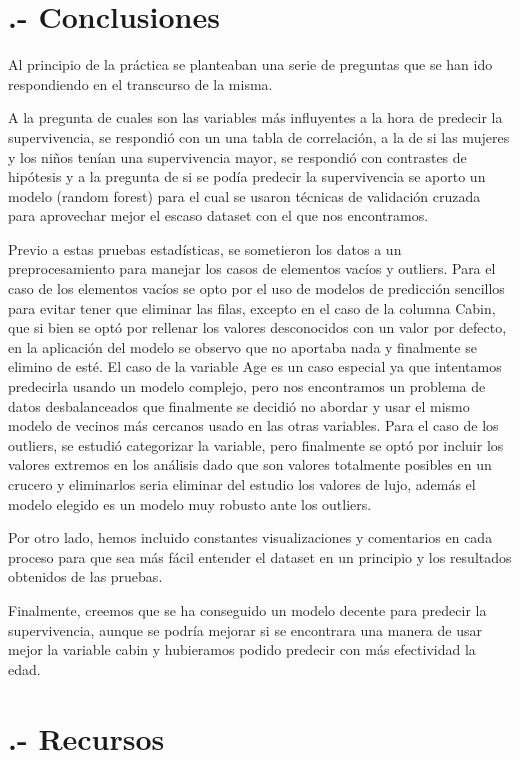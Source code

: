 \documentclass[
]{article}
\begin{document}
\hypertarget{conclusiones}{%
\section{.- Conclusiones}\label{conclusiones}}

Al principio de la práctica se planteaban una serie de preguntas que se
han ido respondiendo en el transcurso de la misma.

A la pregunta de cuales son las variables más influyentes a la hora de
predecir la supervivencia, se respondió con un una tabla de correlación,
a la de si las mujeres y los niños tenían una supervivencia mayor, se
respondió con contrastes de hipótesis y a la pregunta de si se podía
predecir la supervivencia se aporto un modelo (random forest) para el
cual se usaron técnicas de validación cruzada para aprovechar mejor el
escaso dataset con el que nos encontramos.

Previo a estas pruebas estadísticas, se sometieron los datos a un
preprocesamiento para manejar los casos de elementos vacíos y outliers.
Para el caso de los elementos vacíos se opto por el uso de modelos de
predicción sencillos para evitar tener que eliminar las filas, excepto
en el caso de la columna Cabin, que si bien se optó por rellenar los
valores desconocidos con un valor por defecto, en la aplicación del
modelo se observo que no aportaba nada y finalmente se elimino de esté.
El caso de la variable Age es un caso especial ya que intentamos
predecirla usando un modelo complejo, pero nos encontramos un problema
de datos desbalanceados que finalmente se decidió no abordar y usar el
mismo modelo de vecinos más cercanos usado en las otras variables. Para
el caso de los outliers, se estudió categorizar la variable, pero
finalmente se optó por incluir los valores extremos en los análisis dado
que son valores totalmente posibles en un crucero y eliminarlos seria
eliminar del estudio los valores de lujo, además el modelo elegido es un
modelo muy robusto ante los outliers.

Por otro lado, hemos incluido constantes visualizaciones y comentarios
en cada proceso para que sea más fácil entender el dataset en un
principio y los resultados obtenidos de las pruebas.

Finalmente, creemos que se ha conseguido un modelo decente para predecir
la supervivencia, aunque se podría mejorar si se encontrara una manera
de usar mejor la variable cabin y hubieramos podido predecir con más
efectividad la edad.

\hypertarget{recursos}{%
\section{.- Recursos}\label{recursos}}
\end{document}
